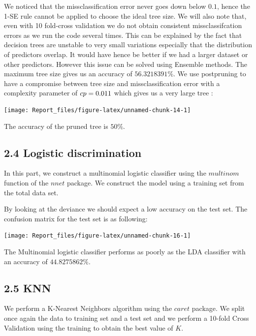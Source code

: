 \documentclass[]{article}
\begin{document}
We noticed that the missclassification error never goes down below
\(0.1\), hence the 1-SE rule cannot be applied to choose the ideal tree
size. We will also note that, even with 10 fold-cross validation we do
not obtain consistent missclassifcation errors as we run the code
several times. This can be explained by the fact that decision trees are
unstable to very small variations especially that the distribution of
predictors overlap. It would have hence be better if we had a larger
dataset or other predictors. However this issue can be solved using
Ensemble methods. The maximum tree size gives us an accuracy of
\(56.3218391\%\). We use postpruning to have a compromise between tree
size and missclassification error with a complexity parameter of
\(cp = 0.011 \space\) which gives us a very large tree :

\begin{center}\texttt{[image: Report\_files/figure-latex/unnamed-chunk-14-1]} \end{center}

The accuracy of the pruned tree is \(50\%\).

\subsection{2.4 Logistic discrimination}\label{logistic-discrimination}

In this part, we construct a multinomial logistic classifier using the
\(multinom\) function of the \(nnet\) package. We construct the model
using a training set from the total data set.

By looking at the deviance we should expect a low accuracy on the test
set. The confusion matrix for the test set is as following:

\begin{center}\texttt{[image: Report\_files/figure-latex/unnamed-chunk-16-1]} \end{center}

The Multinomial logistic classifier performs as poorly as the LDA
classifier with an accuracy of \(44.8275862\%\).

\subsection{2.5 KNN}\label{knn}

We perform a K-Nearest Neighbors algorithm using the \(caret\) package.
We split once again the data to training set and a test set and we
perform a 10-fold Cross Validation using the training to obtain the best
value of \(K\).
\end{document}
